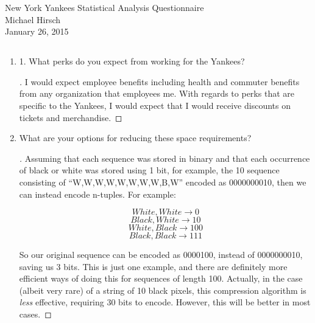 \documentclass[]{book}
\theoremstyle{definition}
\begin{document}
\begin{center}
{\Large New York Yankees Statistical Analysis Questionnaire}\\
Michael Hirsch\\ %
January 26, 2015 %
\end{center}

\vspace{0.2 cm}


\subsection*{}


\begin{enumerate}
\item\label{norms}

1.	What perks do you expect from working for the Yankees?

\begin{proof}[\unskip\nopunct]\renewcommand{\qedsymbol}{}
	I would expect employee benefits including health and commuter benefits from any organization that employees me. With regards to perks that are specific to the Yankees, I would expect that I would receive discounts on tickets and merchandise.
\end{proof}

\item

What are your options for reducing these space requirements?

\begin{proof}[\unskip\nopunct]
Assuming that each sequence was stored in binary and that each occurrence of black or white was stored using 1 bit, for example, the 10 sequence consisting of ``W,W,W,W,W,W,W,W,B,W'' encoded as 0000000010, then we can instead encode n-tuples. For example:

$$White, White \rightarrow 0$$
$$Black, White \rightarrow 10$$
$$White, Black \rightarrow 100$$
$$Black, Black \rightarrow 111$$

So our original sequence can be encoded as 0000100, instead of 0000000010, saving us 3 bits. This is just one example, and there are definitely more efficient ways of doing this for sequences of length 100. Actually, in the case (albeit very rare) of a string of 10 black pixels, this compression algorithm is \textit{less} effective, requiring 30 bits to encode. However, this will be better in most cases.




\end{proof}
\end{enumerate}
\end{document}
